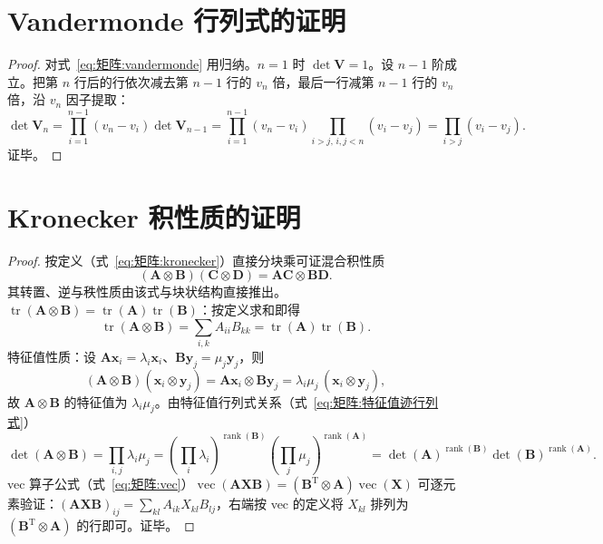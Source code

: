 \section{Vandermonde 行列式的证明}
\label{sec:vandermonde证明}

\begin{proof}
对式~\eqref{eq:矩阵:vandermonde} 用归纳。$n=1$ 时 $\det\boldsymbol{V} = 1$。设 $n-1$ 阶成立。把第 $n$ 行后的行依次减去第 $n-1$ 行的 $v_n$ 倍，最后一行减第 $n-1$ 行的 $v_n$ 倍，沿 $v_n$ 因子提取：
\[
\det\boldsymbol{V}_n = \prod_{i=1}^{n-1}(v_n-v_i)\det\boldsymbol{V}_{n-1} = \prod_{i=1}^{n-1}(v_n-v_i)\prod_{i>j,\,i,j<n}(v_i-v_j) = \prod_{i>j}(v_i-v_j).
\]
证毕。
\end{proof}

\section{Kronecker 积性质的证明}
\label{sec:kronecker证明}

\begin{proof}
按定义（式~\eqref{eq:矩阵:kronecker}）直接分块乘可证混合积性质
\[
(\boldsymbol{A}\otimes\boldsymbol{B})(\boldsymbol{C}\otimes\boldsymbol{D}) = \boldsymbol{A}\boldsymbol{C}\otimes\boldsymbol{B}\boldsymbol{D}.
\]
其转置、逆与秩性质由该式与块状结构直接推出。$\operatorname{tr}(\boldsymbol{A}\otimes\boldsymbol{B}) = \operatorname{tr}(\boldsymbol{A})\operatorname{tr}(\boldsymbol{B})$：按定义求和即得
\[
\operatorname{tr}(\boldsymbol{A}\otimes\boldsymbol{B}) = \sum_{i,k}A_{ii}B_{kk} = \operatorname{tr}(\boldsymbol{A})\operatorname{tr}(\boldsymbol{B}).
\]
特征值性质：设 $\boldsymbol{A}\boldsymbol{x}_i = \lambda_i\boldsymbol{x}_i$、$\boldsymbol{B}\boldsymbol{y}_j = \mu_j\boldsymbol{y}_j$，则
\[
(\boldsymbol{A}\otimes\boldsymbol{B})(\boldsymbol{x}_i\otimes\boldsymbol{y}_j) = \boldsymbol{A}\boldsymbol{x}_i\otimes\boldsymbol{B}\boldsymbol{y}_j = \lambda_i\mu_j\,(\boldsymbol{x}_i\otimes\boldsymbol{y}_j),
\]
故 $\boldsymbol{A}\otimes\boldsymbol{B}$ 的特征值为 $\lambda_i\mu_j$。由特征值行列式关系（式~\eqref{eq:矩阵:特征值迹行列式}）
\[
\det(\boldsymbol{A}\otimes\boldsymbol{B}) = \prod_{i,j}\lambda_i\mu_j = \left(\prod_{i}\lambda_i\right)^{\operatorname{rank}(\boldsymbol{B})}\left(\prod_{j}\mu_j\right)^{\operatorname{rank}(\boldsymbol{A})} = \det(\boldsymbol{A})^{\operatorname{rank}(\boldsymbol{B})}\det(\boldsymbol{B})^{\operatorname{rank}(\boldsymbol{A})}.
\]
vec 算子公式（式~\eqref{eq:矩阵:vec}）$\operatorname{vec}(\boldsymbol{A}\boldsymbol{X}\boldsymbol{B}) = (\boldsymbol{B}^{\mathrm{T}}\otimes\boldsymbol{A})\operatorname{vec}(\boldsymbol{X})$ 可逐元素验证：$(\boldsymbol{A}\boldsymbol{X}\boldsymbol{B})_{ij} = \sum_{kl}A_{ik}X_{kl}B_{lj}$，右端按 vec 的定义将 $X_{kl}$ 排列为 $(\boldsymbol{B}^{\mathrm{T}}\otimes\boldsymbol{A})$ 的行即可。证毕。
\end{proof}

